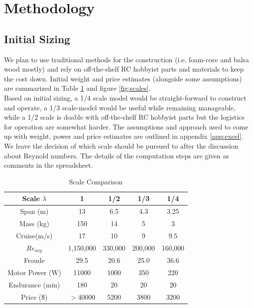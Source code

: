 \documentclass[titlepage,10pt]{article}
\begin{document}
\section{Methodology}
\subsection{Initial Sizing}
\label{sec:initialsizing}
We plan to use traditional methods for the construction (i.e. foam-core and balsa wood mostly) and rely on off-the-shelf RC hobbyist parts and materials to keep the cost down. Initial weight and price estimates (alongside some assumptions) are summarized in Table \ref{tab:scales} and figure \ref{fig:scales}.\\

Based on initial sizing, a 1/4 scale model would be straight-forward to construct and operate, a 1/3 scale-model would be useful while remaining manageable, while a 1/2 scale is doable with off-the-shelf RC hobbyist parts but the logistics for operation are somewhat harder. The assumptions and approach used to come up with weight, power and price estimates are outlined in appendix \ref{app:excel}. We leave the decision of which scale should be pursued to after the discussion about Reynold numbers. The details of the computation steps are given as comments in the spreadsheet.

\begin{table}[h]
\begin{center}
\begin{tabular}{|c|c|c|c|c|}
\hline
Scale $\lambda$	& 1 & 1/2 & 1/3 & 1/4 \\ \hline
Span (m)	& 13& 6.5 & 4.3 & 3.25\\ 
Mass (kg)	& 150& 14 & 5   & 3 \\
Cruise(m/s)	& 17 & 10 & 9   & 9.5 \\
$Re_{avg}$  	& 1,150,000 & 330,000 & 200,000 & 160,000 \\
Froude		& 29.5 & 20.6 & 25.0 & 36.6 \\
Motor Power (W) & 11000 & 1000 & 350 & 220 \\
Endurance (min) & 180  & 20 & 20 & 20 \\
Price (\$)      & $>$40000 & 5200 & 3800 & 3200 \\
\hline
\end{tabular}
\caption{Scale Comparison}
\label{tab:scales}
\end{center}
\end{table}
\end{document}
